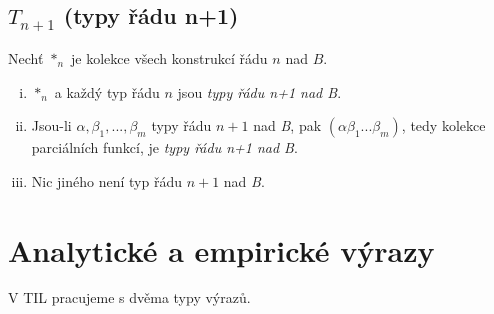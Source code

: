 \subsection{$T_{n+1}$ (typy řádu n+1)}

Nechť $*_n$ je kolekce všech konstrukcí řádu $n$ nad $B$.

\begin{enumerate}[i)]
    \item $*_n$ a každý typ řádu $n$ jsou \textit{typy řádu n+1 nad B}.
    \item Jsou-li $\alpha, \beta_1,...,\beta_m$ typy řádu $n+1$ nad \textit{B}, pak
        $(\alpha \beta_1...\beta_m)$, tedy kolekce parciálních funkcí, je
        \textit{typy řádu n+1 nad B}.
    \item Nic jiného není typ řádu $n+1$ nad \textit{B}.
\end{enumerate}







\section{Analytické a empirické výrazy}

V TIL pracujeme s dvěma typy výrazů.

\endinput
